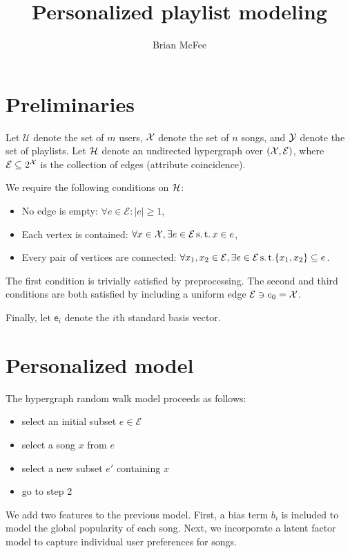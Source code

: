 \documentclass{article}
\title{Personalized playlist modeling}
\author{Brian McFee}
\def\e{\ensuremath{\mathsf{e}}}
\def\E{\ensuremath{\mathcal{E}}}
\def\U{\ensuremath{\mathcal{U}}}
\begin{document}
\maketitle

\section{Preliminaries}

Let $\U$ denote the set of $m$ users, $\mathcal{X}$ denote the set of $n$ songs, and $\mathcal{Y}$ denote the set of playlists.
Let $\mathcal{H}$ denote an undirected hypergraph over $(\X, \E)$, where $\E \subseteq 2^\X$ is the
collection of edges (attribute coincidence).

We require the following conditions on $\mathcal{H}$:
\begin{itemize}
\item No edge is empty: $\forall e \in \E: |e| \geq 1$,
\item Each vertex is contained: $\forall x \in \X, \exists e \in \E \suchthat x \in e$,
\item Every pair of vertices are connected: $\forall x_1, x_2 \in \E, \exists e \in \E \suchthat \{x_1, x_2\} \subseteq e$.
\end{itemize}

The first condition is trivially satisfied by preprocessing.  The second and third conditions are both satisfied by including a uniform edge $\E \ni e_0 = \X$.

Finally, let $\e_i$ denote the $i$th standard basis vector.

\section{Personalized model}

The hypergraph random walk model proceeds as follows:
\begin{itemize}
\item select an initial subset $e \in \E$
\item select a song $x$ from $e$
\item select a new subset $e'$ containing $x$
\item go to step 2
\end{itemize}

We add two features to the previous model.  First, a bias term $b_i$ is included to model the global popularity of each
song.  Next, we incorporate a latent factor model to capture individual user preferences for songs.
\end{document}
